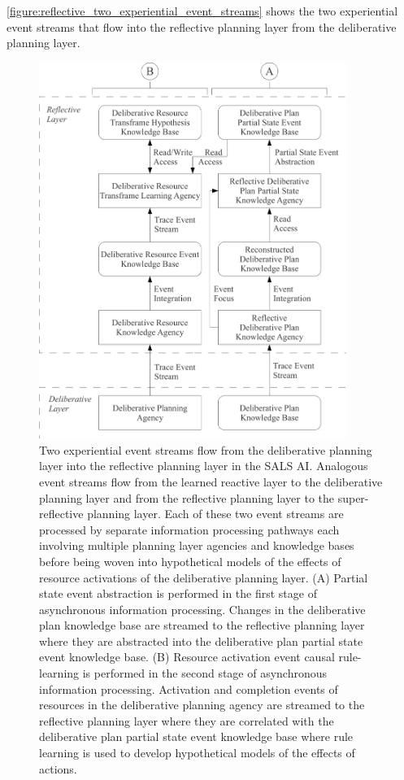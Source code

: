{\mbox{\autoref{figure:reflective_two_experiential_event_streams}}}
shows the two experiential event streams that flow into the reflective
planning layer from the deliberative planning layer.
\begin{figure}
\centering
\includegraphics[width=10cm]{gfx/reflective_two_experiential_event_streams}
\caption[Two experiential event streams flow from the deliberative
  planning layer into the reflective planning layer in the SALS
  AI.]{Two experiential event streams flow from the deliberative
  planning layer into the reflective planning layer in the SALS AI.
  Analogous event streams flow from the learned reactive layer to the
  deliberative planning layer and from the reflective planning layer
  to the super-reflective planning layer.  Each of these two event
  streams are processed by separate information processing pathways
  each involving multiple planning layer agencies and knowledge bases
  before being woven into hypothetical models of the effects of
  resource activations of the deliberative planning layer.  (A)
  Partial state event abstraction is performed in the first stage of
  asynchronous information processing.  Changes in the deliberative
  plan knowledge base are streamed to the reflective planning layer
  where they are abstracted into the deliberative plan partial state
  event knowledge base.  (B) Resource activation event causal
  rule-learning is performed in the second stage of asynchronous
  information processing.  Activation and completion events of
  resources in the deliberative planning agency are streamed to the
  reflective planning layer where they are correlated with the
  deliberative plan partial state event knowledge base where rule
  learning is used to develop hypothetical models of the effects of
  actions.}
\label{figure:reflective_two_experiential_event_streams}
\end{figure}
